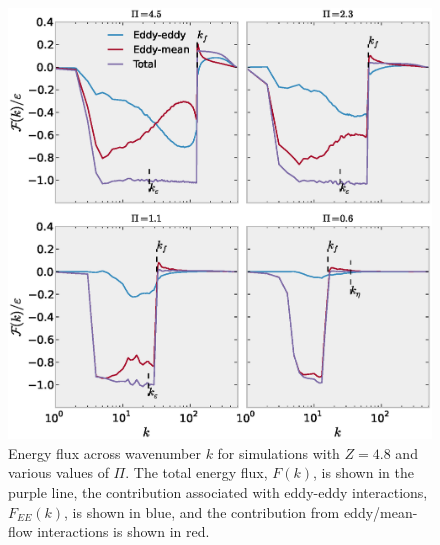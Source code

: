 \documentclass{jfm}
\begin{document}
\begin{figure}
\begin{center}
\includegraphics[width=6in]{NLflux_drag8e-4}\caption{Energy flux across wavenumber $k$ for simulations with $Z=4.8$ and
various values of $\Pi$. The total energy flux, $F(k)$, is shown in
the purple line, the contribution associated with eddy-eddy interactions, $F_{EE}(k)$, is
shown in blue, and the contribution from eddy/mean-flow interactions is shown in red.}
\label{energy_flux_drag8e-4}
\end{center}
\end{figure}
\end{document}
